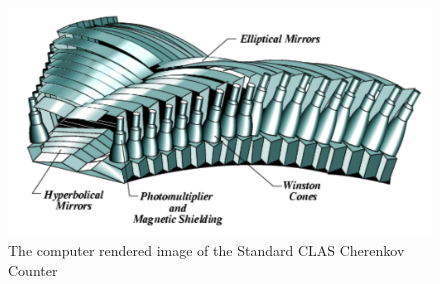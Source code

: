 \begin{figure}[h] %
\centering
\leavevmode \includegraphics[width=1.0\textwidth]{figuresEG4/FigExp/ccunit.png}  %
\caption[The Standard CLAS Cherenkov Counter]{The computer rendered image of the Standard CLAS Cherenkov Counter}
\label{figcherenkov}%
\end{figure}

